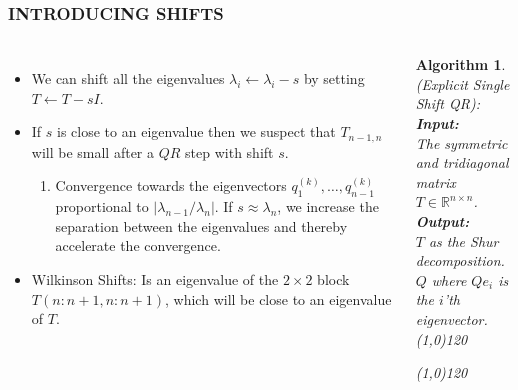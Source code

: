 \documentclass[a4paper,8pt]{beamer} %
\newtheorem{algo}{Algorithm}%
\begin{document}
\begin{frame}  %
\frametitle{INTRODUCING SHIFTS}
\begin{columns}

\column{7cm}
\begin{itemize}
	\item We can shift all the eigenvalues $\lambda_i\gets\lambda_{i}-s$ 
	by setting $T\gets T-sI$.
	\item 
	If $s$ is close to an eigenvalue then we suspect that 
	$T_{n-1,n}$ will be small after a $QR$ step with shift $s$. 
	\begin{enumerate}
	\item
	Convergence towards the eigenvectors $q^{(k)}_1,\dots,q^{(k)}_{n-1}$
	proportional to $|\lambda_{n-1}/\lambda_{n}|$.
	If $s\approx\lambda_{n}$, we increase the separation 
	between the eigenvalues and thereby accelerate the convergence. 
	\end{enumerate}
	\item Wilkinson Shifts: Is an eigenvalue of the $2\times2$ block $T(n:n+1, n:n+1)$, which
	will be close to an eigenvalue of $T$. %
\end{itemize}

\column{5cm}
%
%
\begin{algo}
{
%
	(Explicit Single Shift QR):
%
}\\
\textbf{Input: }
{
%
	\\The symmetric and tridiagonal matrix $T\in\mathbb R^{n\times n}$.
%
}\\
\textbf{Output: }
{
%
	\\$T$ as the Shur decomposition.
	\\$Q$ where $Qe_i$ is the $i$'th eigenvector.
%
}\\
\line(1,0){120}
\begin{algorithmic}
%
\EndFor{}
%
\end{algorithmic}
\label{algQRSingleShiflExplicit}
\line(1,0){120}
\end{algo}
%
\end{columns}
\end{frame} %
\end{document}
